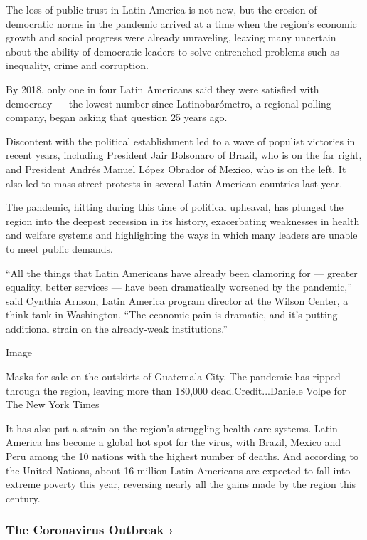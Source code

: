 The loss of public trust in Latin America is not new, but the erosion of
democratic norms in the pandemic arrived at a time when the region's
economic growth and social progress were already unraveling, leaving
many uncertain about the ability of democratic leaders to solve
entrenched problems such as inequality, crime and corruption.

By 2018, only one in four Latin Americans said they were satisfied with
democracy --- the lowest number since Latinobarómetro, a regional
polling company, began asking that question 25 years ago.

Discontent with the political establishment led to a wave of populist
victories in recent years, including President Jair Bolsonaro of Brazil,
who is on the far right, and President Andrés Manuel López Obrador of
Mexico, who is on the left. It also led to mass street protests in
several Latin American countries last year.

The pandemic, hitting during this time of political upheaval, has
plunged the region into the deepest recession in its history,
exacerbating weaknesses in health and welfare systems and highlighting
the ways in which many leaders are unable to meet public demands.

``All the things that Latin Americans have already been clamoring for
--- greater equality, better services --- have been dramatically
worsened by the pandemic,'' said Cynthia Arnson, Latin America program
director at the Wilson Center, a think-tank in Washington. ``The
economic pain is dramatic, and it's putting additional strain on the
already-weak institutions.''

Image

Masks for sale on the outskirts of Guatemala City. The pandemic has
ripped through the region, leaving more than 180,000
dead.Credit...Daniele Volpe for The New York Times

It has also put a strain on the region's struggling health care systems.
Latin America has become a global hot spot for the virus, with Brazil,
Mexico and Peru among the 10 nations with the highest number of deaths.
And according to the United Nations, about 16 million Latin Americans
are expected to fall into extreme poverty this year, reversing nearly
all the gains made by the region this century.

\href{https://www.nytimes.com/news-event/coronavirus?action=click\&pgtype=Article\&state=default\&region=MAIN_CONTENT_3\&context=storylines_faq}{}

\hypertarget{the-coronavirus-outbreak-}{%
\subsubsection{The Coronavirus Outbreak
›}\label{the-coronavirus-outbreak-}}

